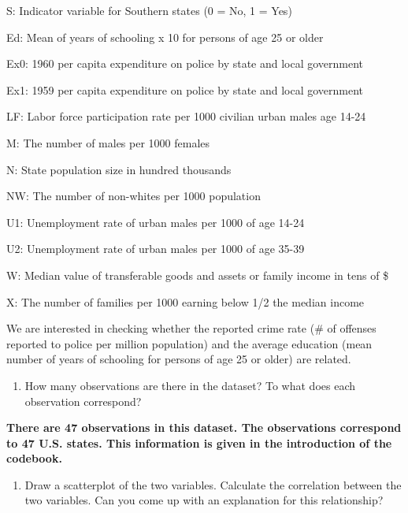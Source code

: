 \documentclass[
]{article}
\newenvironment{Shaded}{\begin{snugshade}}{\end{snugshade}}
\newcommand{\AttributeTok}[1]{\textcolor[rgb]{0.77,0.63,0.00}{#1}}
\newcommand{\ConstantTok}[1]{\textcolor[rgb]{0.00,0.00,0.00}{#1}}
\newcommand{\DecValTok}[1]{\textcolor[rgb]{0.00,0.00,0.81}{#1}}
\newcommand{\FunctionTok}[1]{\textcolor[rgb]{0.00,0.00,0.00}{#1}}
\newcommand{\NormalTok}[1]{#1}
\newcommand{\OtherTok}[1]{\textcolor[rgb]{0.56,0.35,0.01}{#1}}
\newcommand{\SpecialCharTok}[1]{\textcolor[rgb]{0.00,0.00,0.00}{#1}}
\newcommand{\StringTok}[1]{\textcolor[rgb]{0.31,0.60,0.02}{#1}}
\providecommand{\tightlist}{%
  \setlength{\itemsep}{0pt}\setlength{\parskip}{0pt}}
\begin{document}
S: Indicator variable for Southern states (0 = No, 1 = Yes)

Ed: Mean of years of schooling x 10 for persons of age 25 or older

Ex0: 1960 per capita expenditure on police by state and local government

Ex1: 1959 per capita expenditure on police by state and local government

LF: Labor force participation rate per 1000 civilian urban males age
14-24

M: The number of males per 1000 females

N: State population size in hundred thousands

NW: The number of non-whites per 1000 population

U1: Unemployment rate of urban males per 1000 of age 14-24

U2: Unemployment rate of urban males per 1000 of age 35-39

W: Median value of transferable goods and assets or family income in
tens of \$

X: The number of families per 1000 earning below 1/2 the median income

We are interested in checking whether the reported crime rate (\# of
offenses reported to police per million population) and the average
education (mean number of years of schooling for persons of age 25 or
older) are related.

\begin{enumerate}
\def\labelenumi{\arabic{enumi}.}
\tightlist
\item
  How many observations are there in the dataset? To what does each
  observation correspond?
\end{enumerate}

\textbf{There are 47 observations in this dataset. The observations
correspond to 47 U.S. states. This information is given in the
introduction of the codebook. }

\begin{enumerate}
\def\labelenumi{\arabic{enumi}.}
\setcounter{enumi}{1}
\tightlist
\item
  Draw a scatterplot of the two variables. Calculate the correlation
  between the two variables. Can you come up with an explanation for
  this relationship?
\end{enumerate}

\begin{Shaded}
\end{Shaded}
\end{document}
